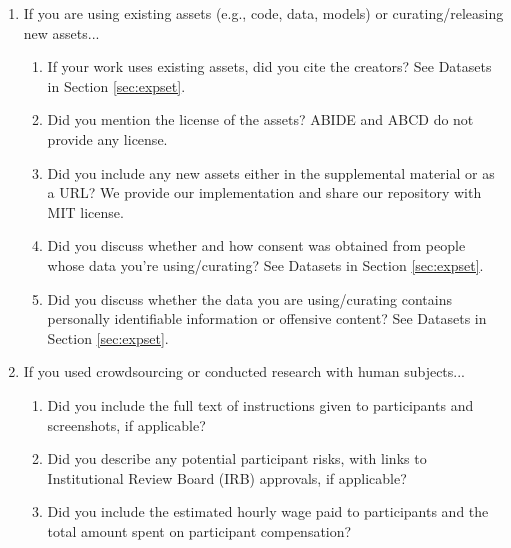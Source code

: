 \begin{enumerate}
\item If you are using existing assets (e.g., code, data, models) or curating/releasing new assets...
\begin{enumerate}
  \item If your work uses existing assets, did you cite the creators?
    \answerYes{} See Datasets in Section \ref{sec:expset}.
  \item Did you mention the license of the assets?
    \answerNA{} ABIDE and ABCD do not provide any license.
  \item Did you include any new assets either in the supplemental material or as a URL?
    \answerYes{} We provide our implementation and share our repository with MIT license.
  \item Did you discuss whether and how consent was obtained from people whose data you're using/curating?
    \answerYes{} See Datasets in Section \ref{sec:expset}.
  \item Did you discuss whether the data you are using/curating contains personally identifiable information or offensive content?
    \answerYes{} See Datasets in Section \ref{sec:expset}.
\end{enumerate}


\item If you used crowdsourcing or conducted research with human subjects...
\begin{enumerate}
  \item Did you include the full text of instructions given to participants and screenshots, if applicable?
    \answerNA{}
  \item Did you describe any potential participant risks, with links to Institutional Review Board (IRB) approvals, if applicable?
    \answerNA{}
  \item Did you include the estimated hourly wage paid to participants and the total amount spent on participant compensation?
    \answerNA{}
\end{enumerate}


\end{enumerate}